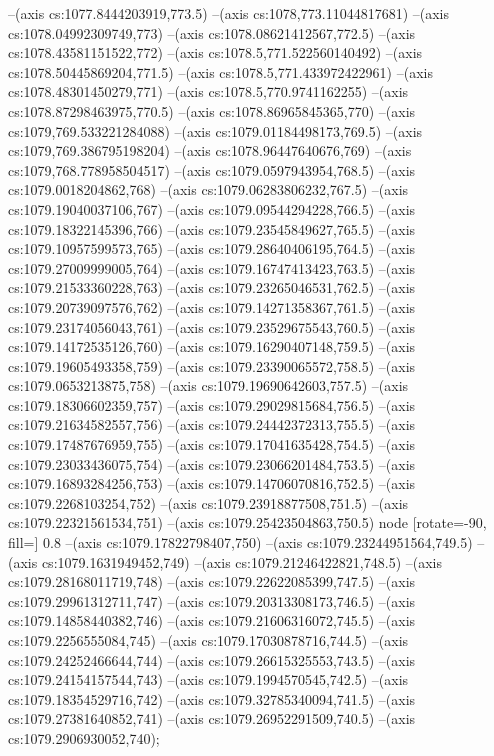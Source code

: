 --(axis cs:1077.8444203919,773.5)
--(axis cs:1078,773.11044817681)
--(axis cs:1078.04992309749,773)
--(axis cs:1078.08621412567,772.5)
--(axis cs:1078.43581151522,772)
--(axis cs:1078.5,771.522560140492)
--(axis cs:1078.50445869204,771.5)
--(axis cs:1078.5,771.433972422961)
--(axis cs:1078.48301450279,771)
--(axis cs:1078.5,770.9741162255)
--(axis cs:1078.87298463975,770.5)
--(axis cs:1078.86965845365,770)
--(axis cs:1079,769.533221284088)
--(axis cs:1079.01184498173,769.5)
--(axis cs:1079,769.386795198204)
--(axis cs:1078.96447640676,769)
--(axis cs:1079,768.778958504517)
--(axis cs:1079.0597943954,768.5)
--(axis cs:1079.0018204862,768)
--(axis cs:1079.06283806232,767.5)
--(axis cs:1079.19040037106,767)
--(axis cs:1079.09544294228,766.5)
--(axis cs:1079.18322145396,766)
--(axis cs:1079.23545849627,765.5)
--(axis cs:1079.10957599573,765)
--(axis cs:1079.28640406195,764.5)
--(axis cs:1079.27009999005,764)
--(axis cs:1079.16747413423,763.5)
--(axis cs:1079.21533360228,763)
--(axis cs:1079.23265046531,762.5)
--(axis cs:1079.20739097576,762)
--(axis cs:1079.14271358367,761.5)
--(axis cs:1079.23174056043,761)
--(axis cs:1079.23529675543,760.5)
--(axis cs:1079.14172535126,760)
--(axis cs:1079.16290407148,759.5)
--(axis cs:1079.19605493358,759)
--(axis cs:1079.23390065572,758.5)
--(axis cs:1079.0653213875,758)
--(axis cs:1079.19690642603,757.5)
--(axis cs:1079.18306602359,757)
--(axis cs:1079.29029815684,756.5)
--(axis cs:1079.21634582557,756)
--(axis cs:1079.24442372313,755.5)
--(axis cs:1079.17487676959,755)
--(axis cs:1079.17041635428,754.5)
--(axis cs:1079.23033436075,754)
--(axis cs:1079.23066201484,753.5)
--(axis cs:1079.16893284256,753)
--(axis cs:1079.14706070816,752.5)
--(axis cs:1079.2268103254,752)
--(axis cs:1079.23918877508,751.5)
--(axis cs:1079.22321561534,751)
--(axis cs:1079.25423504863,750.5) node [rotate=-90, fill=\bgcol] {0.8}
--(axis cs:1079.17822798407,750)
--(axis cs:1079.23244951564,749.5)
--(axis cs:1079.1631949452,749)
--(axis cs:1079.21246422821,748.5)
--(axis cs:1079.28168011719,748)
--(axis cs:1079.22622085399,747.5)
--(axis cs:1079.29961312711,747)
--(axis cs:1079.20313308173,746.5)
--(axis cs:1079.14858440382,746)
--(axis cs:1079.21606316072,745.5)
--(axis cs:1079.2256555084,745)
--(axis cs:1079.17030878716,744.5)
--(axis cs:1079.24252466644,744)
--(axis cs:1079.26615325553,743.5)
--(axis cs:1079.24154157544,743)
--(axis cs:1079.1994570545,742.5)
--(axis cs:1079.18354529716,742)
--(axis cs:1079.32785340094,741.5)
--(axis cs:1079.27381640852,741)
--(axis cs:1079.26952291509,740.5)
--(axis cs:1079.2906930052,740);
